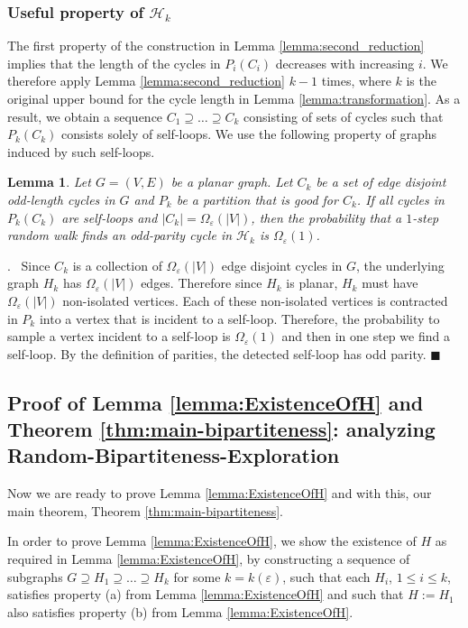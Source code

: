 \documentclass[11pt]{article}
\newenvironment{proof}{\noindent {\bf Proof}.\ }{\qed \par\vskip 4mm\par}
\newtheorem{lemma}[theorem]{Lemma}
\newcommand{\sq}{\hbox{\rlap{$\sqcap$}$\sqcup$}}
\newcommand{\qed}{\hspace*{\fill}\sq}
\renewcommand{\qed}{\hspace*{\fill}\ensuremath{\blacksquare}}
\newcommand{\eps}{\ensuremath{\epsilon}}
\def\epsilon{\ensuremath{\varepsilon}}
\newcommand{\RBE}{{\bf Random-Bipartiteness-Exploration}}
\begin{document}
\subsubsection{Useful property of $\mathcal H_k$}
\label{subsec:final-self-loops}

The first property of the construction in Lemma \ref{lemma:second_reduction} implies that the length of the cycles in $P_i(C_i)$ decreases with increasing $i$. We therefore apply Lemma \ref{lemma:second_reduction} $k-1$ times, where $k$ is the original upper bound for the cycle length in Lemma \ref{lemma:transformation}. As a result, we obtain a sequence $C_1 \supseteq \dots \supseteq C_k$ consisting of sets of cycles such that $P_k(C_k)$ consists solely of self-loops. We use the following property of graphs induced by such self-loops.

\begin{lemma}
\label{lemma:Selfloops}
Let $G=(V,E)$ be a planar graph. Let $C_k$ be a set of edge disjoint odd-length cycles in $G$ and $P_k$ be a partition that is good for $C_k$. If all cycles in $P_k(C_k)$ are self-loops and $|C_k| = \Omega_{\eps}(|V|)$, then the probability that a $1$-step random walk finds an odd-parity cycle in $\mathcal H_k$ is $\Omega_{\eps}(1)$.
\end{lemma}

\begin{proof}
Since $C_k$ is a collection of $\Omega_{\eps}(|V|)$ edge disjoint cycles in $G$, the underlying graph $H_k$ has $\Omega_{\eps}(|V|)$ edges. Therefore since $H_k$ is planar, $H_k$ must have $\Omega_{\eps}(|V|)$ non-isolated vertices. Each of these non-isolated vertices is contracted in $P_k$ into a vertex that is incident to a self-loop. Therefore, the probability to sample a vertex incident to a self-loop is $\Omega_{\eps}(1)$ and then in one step we find a self-loop. By the definition of parities, the detected self-loop  has odd parity.
\end{proof}



\subsection{Proof of Lemma \ref{lemma:ExistenceOfH} and Theorem \ref{thm:main-bipartiteness}: analyzing \RBE}

Now we are ready to prove Lemma \ref{lemma:ExistenceOfH} and with this, our main theorem, Theorem \ref{thm:main-bipartiteness}.

In order to prove Lemma \ref{lemma:ExistenceOfH}, we show the existence of $H$ as required in Lemma \ref{lemma:ExistenceOfH}, by constructing a sequence of subgraphs $G \supseteq H_1 \supseteq \dots \supseteq H_k$ for some $k=k(\epsilon)$, such that each $H_i$, $1 \le i \le k$, satisfies property (a) from Lemma \ref{lemma:ExistenceOfH} and such that $H:=H_1$ also satisfies property (b) from Lemma \ref{lemma:ExistenceOfH}.
\end{document}
